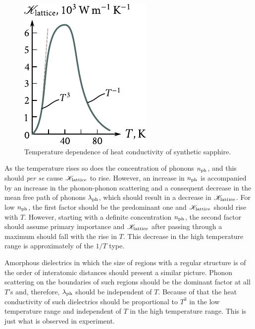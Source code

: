 \begin{figure}[t]
	\begin{center}
		\includegraphics[scale=1]{figures/ch_04/fig_4_9.pdf}
		\caption[]{Temperature dependence of heat conductivity of synthetic sapphire.}
		\label{fig:4_9}
	\end{center}
	\vspace{-0.7cm}
\end{figure}

As the temperature rises so does the concentration of phonons $n_{\text{ph}}$, and this should \textit{per se} cause $\mathscr{K}_{\text{lattice}}$ to rise. However, an increase in $n_{\text{ph}}$ is accompanied by an increase in the phonon-phonon scattering and a consequent decrease in the mean free path of phonons $\lambda_{\text{ph}}$, which should result in a decrease in $\mathscr{K}_{\text{lattice}}$. For low $n_{\text{ph}}$, the first factor should be the predominant one and $\mathscr{K}_{\text{lattice}}$ should rise with $T$.
However, starting with a definite concentration $n_{\text{ph}}$, the second factor should assume primary importance and $\mathscr{K}_{\text{lattice}}$ after passing through a maximum should fall with the rise in $T$. This decrease in the high temperature range is approximately of the $1/T$ type.

Amorphous dielectrics in which the size of regions with a regular structure is of the order of interatomic distances should present a similar picture. Phonon scattering on the boundaries of such regions should be the dominant factor at all $T$'s and, therefore, $\lambda_{\text{ph}}$ should be
independent of $T$. Because of that the heat conductivity of such dielectrics should be proportional to $T^3$ in the low temperature range and independent of $T$ in the high temperature range. This is just what is observed in experiment.

